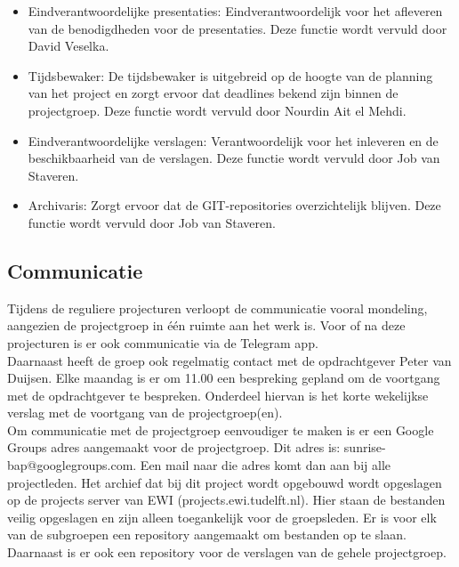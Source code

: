 \begin{itemize}
	\item Eindverantwoordelijke presentaties: Eindverantwoordelijk voor het afleveren van de benodigdheden voor de presentaties. Deze functie wordt vervuld door David Veselka.
	
	\item Tijdsbewaker: De tijdsbewaker is uitgebreid op de hoogte van de planning van het project en zorgt ervoor dat deadlines bekend zijn binnen de projectgroep. Deze functie wordt vervuld door Nourdin Ait el Mehdi.
	
	\item Eindverantwoordelijke verslagen: Verantwoordelijk voor het inleveren en de beschikbaarheid van de verslagen. Deze functie wordt vervuld door Job van Staveren.
	
	\item Archivaris: Zorgt ervoor dat de GIT-repositories overzichtelijk blijven. Deze functie wordt vervuld door Job van Staveren.
\end{itemize}

\subsection{Communicatie}
Tijdens de reguliere projecturen verloopt de communicatie vooral mondeling, aangezien de projectgroep in \'e\'en ruimte aan het werk is. Voor of na deze projecturen is er ook communicatie via de Telegram app.\\
Daarnaast heeft de groep ook regelmatig contact met de opdrachtgever Peter van Duijsen. Elke maandag is er om 11.00 een bespreking gepland om de voortgang met de opdrachtgever te bespreken. Onderdeel hiervan is het korte wekelijkse verslag met de voortgang van de projectgroep(en).\\
Om communicatie met de projectgroep eenvoudiger te maken is er een Google Groups adres aangemaakt voor de projectgroep. Dit adres is: sunrise-bap@googlegroups.com. Een mail naar die adres komt dan aan bij alle projectleden.
Het archief dat bij dit project wordt opgebouwd wordt opgeslagen op de projects server van EWI (projects.ewi.tudelft.nl). Hier staan de bestanden veilig opgeslagen en zijn alleen toegankelijk voor de groepsleden. Er is voor elk van de subgroepen een repository aangemaakt om bestanden op te slaan. Daarnaast is er ook een repository voor de verslagen van de gehele projectgroep.\\